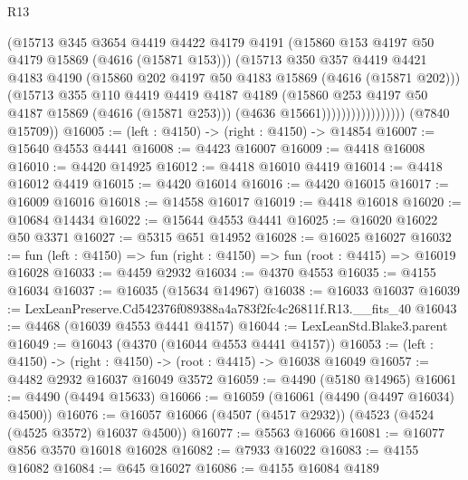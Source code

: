 \begin{lexlean}{R13}
\begin{coremodule}
                                (@15713
                                  @345
                                  @3654
                                  @4419
                                  @4422
                                  @4179
                                  @4191
                                  (@15860 @153 @4197 @50 @4179 @15869 (@4616 (@15871 @153)))
                                  (@15713
                                    @350
                                    @357
                                    @4419
                                    @4421
                                    @4183
                                    @4190
                                    (@15860 @202 @4197 @50 @4183 @15869 (@4616 (@15871 @202)))
                                    (@15713
                                      @355
                                      @110
                                      @4419
                                      @4419
                                      @4187
                                      @4189
                                      (@15860 @253 @4197 @50 @4187 @15869 (@4616 (@15871 @253)))
                                      (@4636 @15661)))))))))))))))))
      (@7840 @15709))
@16005 := (left : @4150) -> (right : @4150) -> @14854
@16007 := @15640 @4553 @4441
@16008 := @4423 @16007
@16009 := @4418 @16008
@16010 := @4420 @14925
@16012 := @4418 @16010 @4419
@16014 := @4418 @16012 @4419
@16015 := @4420 @16014
@16016 := @4420 @16015
@16017 := @16009 @16016
@16018 := @14558 @16017
@16019 := @4418 @16018
@16020 := @10684 @14434
@16022 := @15644 @4553 @4441
@16025 := @16020 @16022 @50 @3371
@16027 := @5315 @651 @14952
@16028 := @16025 @16027
@16032 := fun (left : @4150) => fun (right : @4150) => fun (root : @4415) => @16019 @16028
@16033 := @4459 @2932
@16034 := @4370 @4553
@16035 := @4155 @16034
@16037 := @16035 (@15634 @14967)
@16038 := @16033 @16037
@16039 := LexLeanPreserve.Cd542376f089388a4a783f2fc4c26811f.R13.__fits_40
@16043 := @4468 (@16039 @4553 @4441 @4157)
@16044 := LexLeanStd.Blake3.parent
@16049 := @16043 (@4370 (@16044 @4553 @4441 @4157))
@16053 := (left : @4150) -> (right : @4150) -> (root : @4415) -> @16038 @16049
@16057 := @4482 @2932 @16037 @16049 @3572
@16059 := @4490 (@5180 @14965)
@16061 := @4490 (@4494 @15633)
@16066 := @16059 (@16061 (@4490 (@4497 @16034) @4500))
@16076 := @16057 @16066 (@4507 (@4517 @2932)) (@4523 (@4524 (@4525 @3572) @16037 @4500))
@16077 := @5563 @16066
@16081 := @16077 @856 @3570 @16018 @16028
@16082 := @7933 @16022
@16083 := @4155 @16082
@16084 := @645 @16027
@16086 := @4155 @16084 @4189

\end{coremodule}
\end{lexlean}
